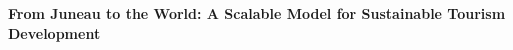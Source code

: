 \begin{center}
    \Large{\textbf{From Juneau to the World: A Scalable Model for Sustainable Tourism Development}}
\end{center}